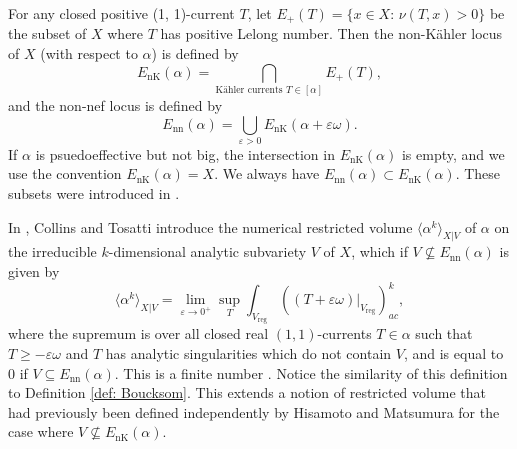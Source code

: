 \documentclass[a4paper]{amsart}
\renewcommand{\epsilon}{\varepsilon}
\newcommand{\nn}{\text{nn}}
\newcommand{\nK}{\text{nK}}
\newcommand{\reg}{{\operatorname{reg}}}
\theoremstyle{definition}
\begin{document}
For any closed positive (1, 1)-current $T$, let $E_+(T) = \{x \in X:\, \nu(T, x) > 0\}$ be the subset of $X$ where $T$ has positive Lelong number. Then the non-K\"ahler locus of $X$ (with respect to $\alpha$) is defined by
\[E_{\nK}(\alpha) = \bigcap_{\text{K\"ahler currents } T \in [\alpha]} E_+(T),\] and the non-nef locus is defined by
\[E_{\nn}(\alpha) = \bigcup_{\epsilon > 0} E_{\nK}(\alpha+\epsilon\omega).\]
If $\alpha$ is psuedoeffective but not big, the intersection in $E_\nK(\alpha)$ is empty, and we use the convention $E_\nK(\alpha) = X$. We always have $E_{\nn}(\alpha) \subset E_{\nK}(\alpha)$. These subsets were introduced in \cite{DivisorialZariski}.

In \cite{RestrictedVol}, Collins and Tosatti introduce the numerical restricted volume $\langle\alpha^k\rangle_{X|V}$ of $\alpha$ on the irreducible $k$-dimensional analytic subvariety $V$ of $X$, which if $V \nsubseteq E_{\nn}(\alpha)$ is given by
\[\langle\alpha^k\rangle_{X|V} = \lim_{\epsilon \to 0^+}\sup_T \int_{V_{\reg}} ((T+\epsilon\omega)|_{V_\reg})^k_{ac},\]
where the supremum is over all closed real $(1, 1)$-currents $T \in \alpha$ such that $T\ge -\epsilon\omega$ and $T$ has analytic singularities which do not contain $V$, and is equal to $0$ if $V \subseteq E_{\nn}(\alpha)$. This is a finite number \cite[Lemma 2.1]{RestrictedVol}. Notice the similarity of this definition to Definition \ref{def: Boucksom}. This extends a notion of restricted volume that had previously been defined independently by Hisamoto \cite{Bergman} and Matsumura \cite{RestrictedZariski} for the case where $V \nsubseteq E_{\nK}(\alpha)$.
\end{document}
